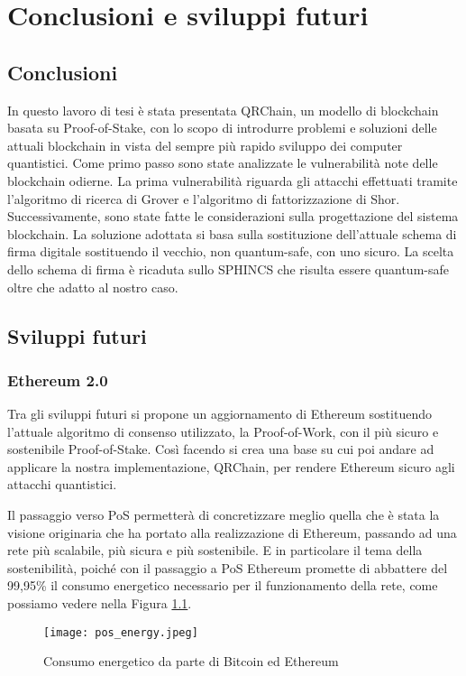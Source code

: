 \chapter{Conclusioni e sviluppi futuri}
\section{Conclusioni}
In questo lavoro di tesi è stata presentata QRChain, un modello di blockchain basata su Proof-of-Stake, con lo scopo di introdurre problemi e soluzioni delle attuali blockchain in vista del sempre più rapido sviluppo dei computer quantistici. Come primo passo sono state analizzate le vulnerabilità note delle blockchain odierne. La prima vulnerabilità riguarda gli attacchi effettuati tramite l'algoritmo di ricerca di Grover e l'algoritmo di fattorizzazione di Shor. Successivamente, sono state fatte le considerazioni sulla progettazione del sistema blockchain. La soluzione adottata si basa sulla sostituzione dell'attuale schema di firma digitale sostituendo il vecchio, non quantum-safe, con uno sicuro. La scelta dello schema di firma è ricaduta sullo SPHINCS che risulta essere quantum-safe oltre che adatto al nostro caso.

\section{Sviluppi futuri}
\subsection{Ethereum 2.0}
Tra gli sviluppi futuri si propone un aggiornamento di Ethereum sostituendo l'attuale algoritmo di consenso utilizzato, la Proof-of-Work, con il più sicuro e sostenibile Proof-of-Stake. Così facendo si crea una base su cui poi andare ad applicare la nostra implementazione, QRChain, per rendere Ethereum sicuro agli attacchi quantistici.

Il passaggio verso PoS permetterà di concretizzare meglio quella che è stata la visione originaria che ha portato alla realizzazione di Ethereum, passando ad una rete più scalabile, più sicura e più sostenibile. E in particolare il tema della sostenibilità, poiché con il passaggio a PoS Ethereum promette di abbattere del 99,95\% il consumo energetico necessario per il funzionamento della rete, come possiamo vedere nella Figura \ref{fig:pos_energy}.

\begin{figure}[h]
  \centering
  \texttt{[image: pos\_energy.jpeg]}
  \caption{Consumo energetico da parte di Bitcoin ed Ethereum}
  \label{fig:pos_energy}
\end{figure}


